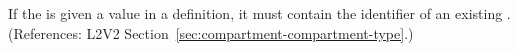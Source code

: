 If the   is given a value in a \Compartment
definition, it must contain the identifier of an existing \CompartmentType.
(References: L2V2 Section~\ref{sec:compartment-compartment-type}.)
